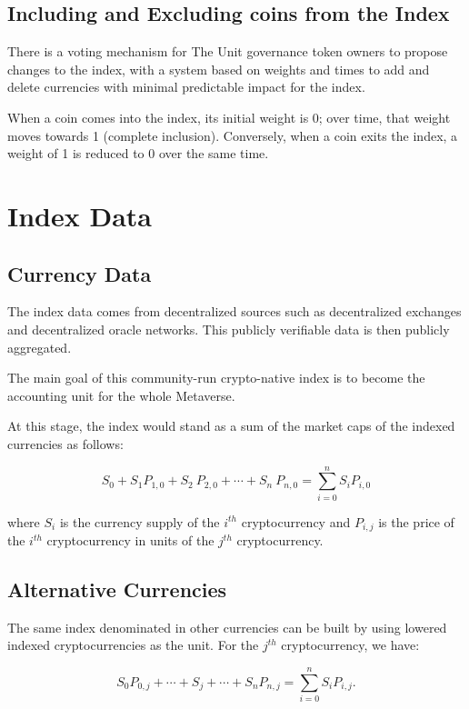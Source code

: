 \documentclass[12pt]{article}
\begin{document}
\subsection{Including and Excluding coins from the Index}

There is a voting mechanism for The Unit governance token owners to propose changes to the index, with a system based on weights and times to add and delete currencies with minimal predictable impact for the index.

When a coin comes into the index, its initial weight is 0; over time, that weight moves towards 1 (complete inclusion). Conversely, when a coin exits the index, a weight of 1 is reduced to 0 over the same time.


\section{Index Data}

\subsection{Currency Data}

The index data comes from decentralized sources such as decentralized exchanges and decentralized oracle networks. This publicly verifiable data is then publicly aggregated.

The main goal of this community-run crypto-native index is to become the accounting unit for the whole Metaverse. 

At this stage, the index would stand as a sum of the market caps of the indexed currencies as follows: 

$$
S_0+S_1 P_{1,0}+ S_2\ P_{2,0}+\cdots+ S_n\ P_{n,0} = \sum_{i=0}^{n} S_iP_{i,0}
$$

where $S_i$ is the currency supply of the $i^{th}$ cryptocurrency and $P_{i,j}$ is the price of the $i^{th}$ cryptocurrency in units of the $j^{th}$ cryptocurrency.

\subsection{Alternative Currencies}

The same index denominated in other currencies can be built by using lowered indexed cryptocurrencies as the unit. For the $j^{th}$ cryptocurrency, we have:

$$
S_0P_{0,j}+\cdots+S_j+\cdots+S_nP_{n,j} = \sum_{i=0}^{n} S_iP_{i,j}.
$$
\end{document}
